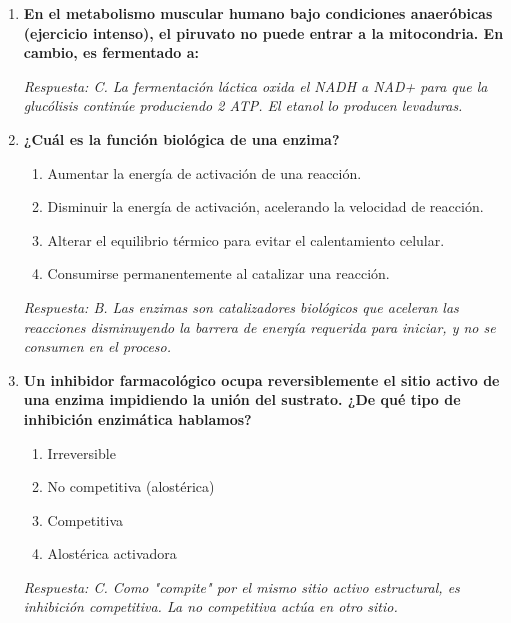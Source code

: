 \documentclass[spanish,letterpaper,oneside]{article}
\begin{document}
\begin{enumerate}[label=\textbf{\arabic*.}]
    \item \textbf{En el metabolismo muscular humano bajo condiciones anaeróbicas (ejercicio intenso), el piruvato no puede entrar a la mitocondria. En cambio, es fermentado a:}
    \textit{Respuesta: C. La fermentación láctica oxida el NADH a NAD+ para que la glucólisis continúe produciendo 2 ATP. El etanol lo producen levaduras.}

    \item \textbf{¿Cuál es la función biológica de una enzima?}
    \begin{enumerate}
        \item[A)] Aumentar la energía de activación de una reacción.
        \item[B)] Disminuir la energía de activación, acelerando la velocidad de reacción.
        \item[C)] Alterar el equilibrio térmico para evitar el calentamiento celular.
        \item[D)] Consumirse permanentemente al catalizar una reacción.
    \end{enumerate}
    \textit{Respuesta: B. Las enzimas son catalizadores biológicos que aceleran las reacciones disminuyendo la barrera de energía requerida para iniciar, y no se consumen en el proceso.}

    \item \textbf{Un inhibidor farmacológico ocupa reversiblemente el sitio activo de una enzima impidiendo la unión del sustrato. ¿De qué tipo de inhibición enzimática hablamos?}
    \begin{enumerate}
        \item[A)] Irreversible
        \item[B)] No competitiva (alostérica)
        \item[C)] Competitiva
        \item[D)] Alostérica activadora
    \end{enumerate}
    \textit{Respuesta: C. Como "compite" por el mismo sitio activo estructural, es inhibición competitiva. La no competitiva actúa en otro sitio.}


\end{enumerate}
\end{document}
